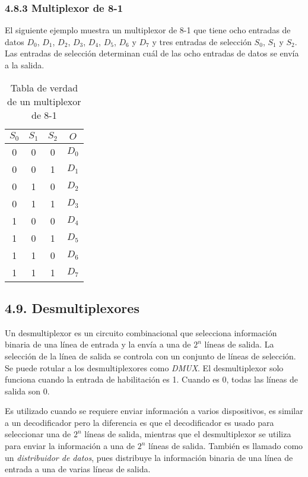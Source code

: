 \subsubsection*{4.8.3 Multiplexor de 8-1}
El siguiente ejemplo muestra un multiplexor de 8-1 que tiene ocho entradas de datos $D_0$, $D_1$, $D_2$, $D_3$, $D_4$, $D_5$, $D_6$ y $D_7$
y tres entradas de selecci\'{o}n $S_0$, $S_1$ y $S_2$. Las entradas de selecci\'{o}n determinan cu\'{a}l de las ocho entradas de datos se env\'{i}a a la salida.

\begin{table}[h]
    \centering
    \begin{tabular}{ccc|c}
        \toprule
        $S_0$ & $S_1$ & $S_2$ & $O$   \\
        \midrule
        0     & 0     & 0     & $D_0$ \\
        0     & 0     & 1     & $D_1$ \\
        0     & 1     & 0     & $D_2$ \\
        0     & 1     & 1     & $D_3$ \\
        1     & 0     & 0     & $D_4$ \\
        1     & 0     & 1     & $D_5$ \\
        1     & 1     & 0     & $D_6$ \\
        1     & 1     & 1     & $D_7$ \\
        \bottomrule
    \end{tabular}
    \caption{Tabla de verdad de un multiplexor de 8-1}
\end{table}

\subsection*{4.9. Desmultiplexores}
Un desmultiplexor es un circuito combinacional que selecciona informaci\'{o}n binaria de una l\'{i}nea de entrada y la env\'{i}a
a una de $2^n$ l\'{i}neas de salida. La selecci\'{o}n de la l\'{i}nea de salida se controla con un conjunto de l\'{i}neas de selecci\'{o}n.
Se puede rotular a los desmultiplexores como \textit{DMUX}.
El desmultiplexor solo funciona cuando la entrada de habilitaci\'{o}n es 1. Cuando es 0, todas las l\'{i}neas de salida son 0.

Es utilizado cuando se requiere enviar informaci\'{o}n a varios dispositivos, es similar a un decodificador pero la diferencia es que
el decodificador es usado para seleccionar una de $2^n$ l\'{i}neas de salida, mientras que el desmultiplexor se utiliza para enviar la
informaci\'{o}n a una de $2^n$ l\'{i}neas de salida.
Tambi\'{e}n es llamado como un \textit{distribuidor de datos}, pues distribuye la informaci\'{o}n binaria de una l\'{i}nea de entrada a una
de varias l\'{i}neas de salida.

